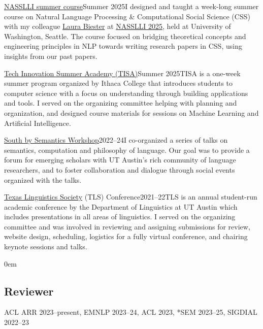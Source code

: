 \smallentry
  {\large \href{https://nasslli25-nlp-css.github.io}{NASSLLI summer course}}{\large Summer 2025}{I designed and taught a week-long summer course on Natural Language Processing \& Computational Social Science (CSS) with my colleague \href{https://www.laurabiester.com}{Laura Biester} at \href{https://nasslli25.shane.st}{NASSLLI 2025}, held at University of Washington, Seattle. The course focused on bridging theoretical concepts and engineering principles in NLP towards writing research papers in CSS, using insights from our past papers.}

\smallentry
  {\large \href{https://www.ithaca.edu/tech-innovation-summer-academy}{Tech Innovation Summer Academy (TISA)}}{\large Summer 2025}{TISA is a one-week summer program organized by Ithaca College that introduces students to computer science with a focus on understanding through building applications and tools. I served on the organizing committee helping with planning and organization, and designed course materials for sessions on Machine Learning and Artificial Intelligence.}

\smallentry
  {\large \href{https://sites.google.com/utexas.edu/sxsw/archive}{South by Semantics Workshop}}{\large 2022--24}{I co-organized a series of talks on semantics, computation and philosophy of language. Our goal was to provide a forum for emerging scholars with UT Austin's rich community of language researchers, and to foster collaboration and dialogue through social events organized with the talks.}
  
\smallentry
    {\large \href{http://tls.ling.utexas.edu/}{Texas Linguistics Society} (TLS) Conference}{\large 2021--22}{TLS is an annual student-run academic conference by the Department of Linguistics at UT Austin which includes presentations in all areas of linguistics. I served on the organizing committee and was involved in reviewing and assigning submissions for review, website design, scheduling, logistics for a fully virtual conference, and chairing keynote sessions and talks.}

\leftskip0em\relax

\subsection{Reviewer}

\quad ACL ARR 2023--present, EMNLP 2023--24, ACL 2023, *SEM 2023--25, SIGDIAL 2022--23
